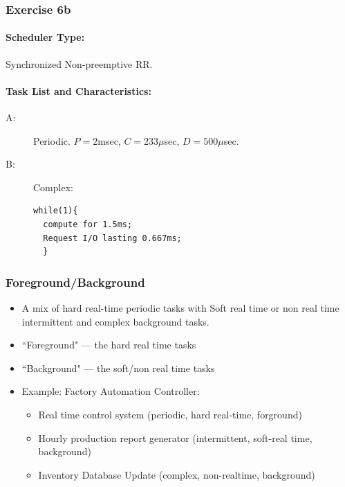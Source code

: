 \documentclass{article}	%
\begin{document}
\subsubsection*{Exercise 6b}

\paragraph{Scheduler Type:} Synchronized Non-preemptive RR.
\paragraph{Task List and Characteristics:}  
            \begin{description}
                \item[A:] Periodic.  $P = 2$msec, $C = 233\mu$sec,
                           $D =500\mu$sec.
                \item[B:] Complex:
\begin{verbatim}
while(1){
  compute for 1.5ms;
  Request I/O lasting 0.667ms;
  }
\end{verbatim}
              \end{description}
 





 
\subsubsection*{Foreground/Background}
\begin{itemize}
        \item A mix of hard real-time periodic tasks with
        Soft real time or non real time intermittent and complex background tasks.
        \item ``Foreground" --- the hard real time tasks
        \item ``Background" --- the soft/non real time tasks
        \item Example: Factory Automation Controller:
        \begin{itemize}
                \item  Real time control system (periodic, hard
real-time, forground)
                \item  Hourly production report generator (intermittent, soft-real time, background)
                \item  Inventory Database Update (complex, non-realtime, background)
        \end{itemize}
\end{itemize}
\end{document}
